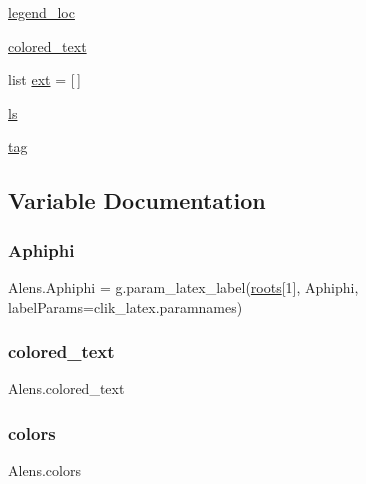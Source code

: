 \begin{DoxyCompactItemize}
\item 
\mbox{\hyperlink{namespaceAlens_a5b314c2eb2d8eb7ef0c10163bf9a507e}{legend\+\_\+loc}}
\item 
\mbox{\hyperlink{namespaceAlens_a4c0725e94f6b70c0981b8cd79660a4e7}{colored\+\_\+text}}
\item 
list \mbox{\hyperlink{namespaceAlens_ae7e51ea6bb44ee0104f5ec1d7842b76a}{ext}} = \mbox{[}$\,$\mbox{]}
\item 
\mbox{\hyperlink{namespaceAlens_ac994dbf7e15439925a9faf3b06586e04}{ls}}
\item 
\mbox{\hyperlink{namespaceAlens_a6810f83023b1df9563911df80e5cd4bc}{tag}}
\end{DoxyCompactItemize}


\subsection{Variable Documentation}
\mbox{\label{namespaceAlens_a26d61581ebe70785d0386d82de6c38c9}} 
\subsubsection{\texorpdfstring{Aphiphi}{Aphiphi}}
{\footnotesize\ttfamily Alens.\+Aphiphi = g.\+param\+\_\+latex\+\_\+label(\mbox{\hyperlink{namespaceAlens_a153a8685dae4e7bca589dcd5ab3570c5}{roots}}\mbox{[}1\mbox{]}, \textquotesingle{}Aphiphi\textquotesingle{}, label\+Params=\textquotesingle{}clik\+\_\+latex.\+paramnames\textquotesingle{})}

\mbox{\label{namespaceAlens_a4c0725e94f6b70c0981b8cd79660a4e7}} 
\subsubsection{\texorpdfstring{colored\+\_\+text}{colored\_text}}
{\footnotesize\ttfamily Alens.\+colored\+\_\+text}

\mbox{\label{namespaceAlens_a7ee2dfcbff2768280fd98d5ef305755f}} 
\subsubsection{\texorpdfstring{colors}{colors}}
{\footnotesize\ttfamily Alens.\+colors}

